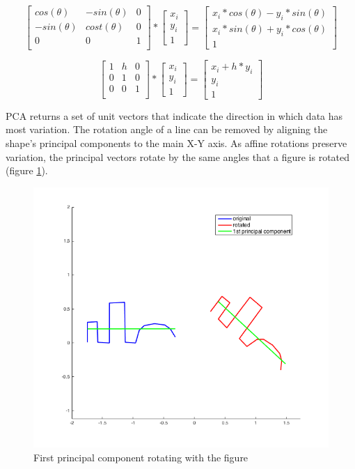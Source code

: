 \documentclass[
    floatsintext
]{article}
\begin{document}
\begin{equation}
  \begin{bmatrix}
    cos(\theta)  & -sin(\theta) &   0 \\
    -sin(\theta) & cost(\theta) &   0 \\
    	0   	 &	0       &   1 \\ 
  \end{bmatrix} 
  *
  \begin{bmatrix}
    x_i \\ y_i \\ 1
  \end{bmatrix} 
  = 
  \begin{bmatrix}
    x_i * cos(\theta) - y_i * sin(\theta) \\ x_i * sin(\theta) + y_i * cos(\theta) \\ 1
  \end{bmatrix} 
  \label{eq:rotate}
\end{equation}


\begin{equation}
  \begin{bmatrix}
    1 & h & 0 \\
    0 & 1 & 0 \\
    0 & 0 & 1   \\ 
  \end{bmatrix} 
  *
  \begin{bmatrix}
    x_i \\ y_i \\ 1
  \end{bmatrix} 
  = 
  \begin{bmatrix}
    x_i + h * y_i \\ y_i \\ 1  
  \end{bmatrix}
  \label{eq:shear}
\end{equation}

PCA returns a set of unit vectors that indicate the direction in which data has most variation. 
The rotation angle of a line can be removed by aligning the shape's principal components to the main X-Y axis.    
As affine rotations preserve variation, the principal vectors rotate by the same angles that a figure is rotated (figure \ref{fig:pca_rotation}).  

\begin{figure}[h]
  \centering
  \includegraphics[width=.5\textwidth]{./figures/pca_rotation.png}
  \caption{First principal component rotating with the figure}
  \label{fig:pca_rotation}
\end{figure}  
\end{document}
